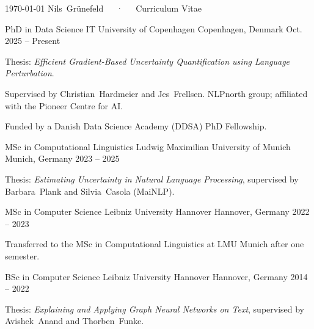 \documentclass[11pt, a4paper]{awesome-cv}
\let\acvOrigSection\cvsection
\renewcommand{\cvsection}[1]{\Needspace*{4cm}\acvOrigSection{#1}}
\begin{document}
\makecvheader[C]
\makecvfooter
  {\today}
  {Nils~Grünefeld~~~·~~~Curriculum Vitae}
  {\thepage}

\begin{cventries}
  \cventry
    {PhD in Data Science}
    {IT University of Copenhagen}
    {Copenhagen, Denmark}
    {Oct. 2025 -- Present}
    {
      \begin{cvitems}
        \item {Thesis: \emph{Efficient Gradient-Based Uncertainty Quantification using Language Perturbation}.}
        \item {Supervised by Christian~Hardmeier and Jes~Frellsen. NLPnorth group; affiliated with the Pioneer Centre for AI.}
        \item {Funded by a Danish Data Science Academy (DDSA) PhD Fellowship.}
      \end{cvitems}
    }
  \cventry
    {MSc in Computational Linguistics}
    {Ludwig Maximilian University of Munich}
    {Munich, Germany}
    {2023 -- 2025}
    {
      \begin{cvitems}
        \item {Thesis: \emph{Estimating Uncertainty in Natural Language Processing}, supervised by Barbara~Plank and Silvia~Casola (MaiNLP).}
      \end{cvitems}
    }
  \cventry
    {MSc in Computer Science}
    {Leibniz University Hannover}
    {Hannover, Germany}
    {2022 -- 2023}
    {
      \begin{cvitems}
        \item {Transferred to the MSc in Computational Linguistics at LMU Munich after one semester.}
      \end{cvitems}
    }
  \cventry
    {BSc in Computer Science}
    {Leibniz University Hannover}
    {Hannover, Germany}
    {2014 -- 2022}
    {
      \begin{cvitems}
        \item {Thesis: \emph{Explaining and Applying Graph Neural Networks on Text}, supervised by Avishek~Anand and Thorben~Funke.}
      \end{cvitems}
    }
\end{cventries}
\end{document}
